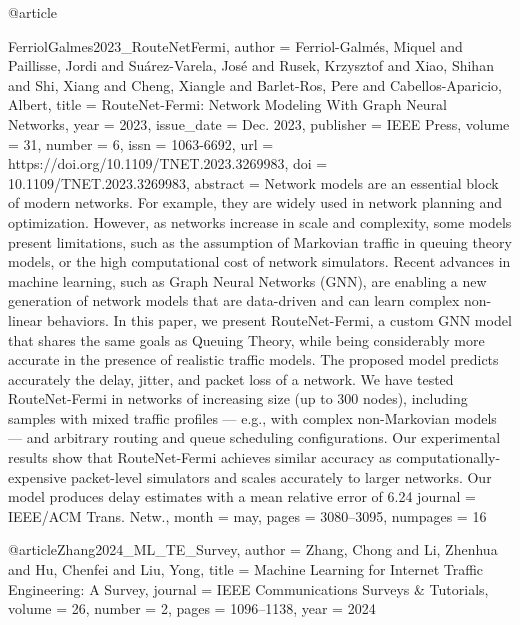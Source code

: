 {@article{FerriolGalmes2023_RouteNetFermi,
author = {Ferriol-Galm\'{e}s, Miquel and Paillisse, Jordi and Su\'{a}rez-Varela, Jos\'{e} and Rusek, Krzysztof and Xiao, Shihan and Shi, Xiang and Cheng, Xiangle and Barlet-Ros, Pere and Cabellos-Aparicio, Albert},
title = {{RouteNet-Fermi: Network Modeling With Graph Neural Networks}},
year = {2023},
issue_date = {Dec. 2023},
publisher = {IEEE Press},
volume = {31},
number = {6},
issn = {1063-6692},
url = {https://doi.org/10.1109/TNET.2023.3269983},
doi = {10.1109/TNET.2023.3269983},
abstract = {Network models are an essential block of modern networks. For example, they are widely used in network planning and optimization. However, as networks increase in scale and complexity, some models present limitations, such as the assumption of Markovian traffic in queuing theory models, or the high computational cost of network simulators. Recent advances in machine learning, such as Graph Neural Networks (GNN), are enabling a new generation of network models that are data-driven and can learn complex non-linear behaviors. In this paper, we present RouteNet-Fermi, a custom GNN model that shares the same goals as Queuing Theory, while being considerably more accurate in the presence of realistic traffic models. The proposed model predicts accurately the delay, jitter, and packet loss of a network. We have tested RouteNet-Fermi in networks of increasing size (up to 300 nodes), including samples with mixed traffic profiles — e.g., with complex non-Markovian models — and arbitrary routing and queue scheduling configurations. Our experimental results show that RouteNet-Fermi achieves similar accuracy as computationally-expensive packet-level simulators and scales accurately to larger networks. Our model produces delay estimates with a mean relative error of 6.24%
journal = {IEEE/ACM Trans. Netw.},
month = may,
pages = {3080–3095},
numpages = {16}
}



@article{Zhang2024_ML_TE_Survey,
    author  = {Zhang, Chong and Li, Zhenhua and Hu, Chenfei and Liu, Yong},
    title   = {Machine Learning for Internet Traffic Engineering: {A} Survey},
    journal = {IEEE Communications Surveys \& Tutorials},
    volume  = {26},
    number  = {2},
    pages   = {1096--1138},
    year    = {2024}
}

}}
